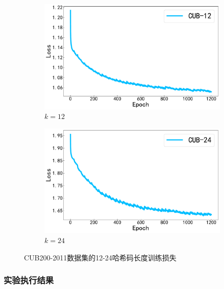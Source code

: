\begin{figure}[h]
  \centering
  \begin{subfigure}{0.48\textwidth}
    \centering
    \includegraphics[width=\linewidth]{./Img/CUB-12.pdf}
    \caption{$k=12$}\label{fig:4-24}
  \end{subfigure}
  \hfil
  \begin{subfigure}{0.48\textwidth}
    \centering
    \includegraphics[width=\linewidth]{./Img/CUB-24.pdf}
    \caption{$k=24$}\label{fig:4-25}
  \end{subfigure}
  \caption{CUB200-2011数据集的12-24哈希码长度训练损失}
  \label{fig:4-28-a}
\end{figure}

\subsubsection{实验执行结果}

